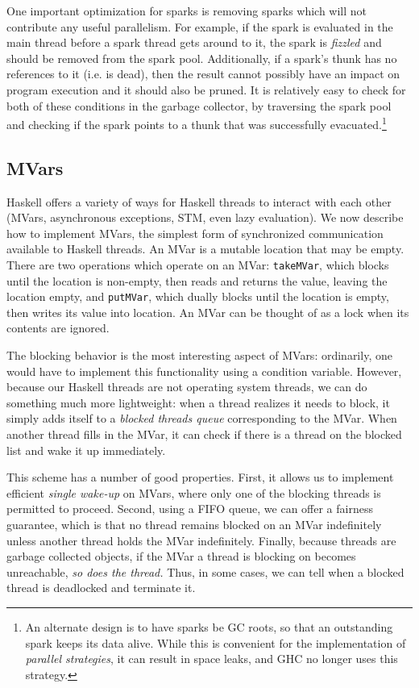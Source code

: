 One important optimization for sparks is removing sparks which will not
contribute any useful parallelism.  For example, if the spark is
evaluated in the main thread before a spark thread gets around to it,
the spark is \emph{fizzled} and should be removed from the spark pool.
Additionally, if a spark's thunk has no references to it (i.e. is dead),
then the result cannot possibly have an impact on program execution and
it should also be pruned.  It is relatively easy to check for both of
these conditions in the garbage collector, by traversing the spark pool
and checking if the spark points to a thunk that was successfully evacuated.\footnote{An alternate design is to have sparks be GC roots, so that an outstanding spark keeps its data alive. While this is convenient for the implementation of \emph{parallel strategies}, it can result in space leaks, and GHC no longer uses this strategy.}

\subsection{MVars}

Haskell offers a variety of ways for Haskell threads to interact with
each other (MVars, asynchronous exceptions, STM, even lazy evaluation).
We now describe how to implement MVars, the simplest form of
synchronized communication available to Haskell threads.  An MVar is a mutable
location that may be empty.  There are two operations which operate on
an MVar: \verb|takeMVar|, which blocks until the location is non-empty,
then reads and returns the value, leaving the location empty, and
\verb|putMVar|, which dually blocks until the location is empty, then
writes its value into location.  An MVar can be thought of as a lock when
its contents are ignored.

The blocking behavior is the most interesting aspect of MVars:
ordinarily, one would have to implement this functionality using a
condition variable.  However, because our Haskell threads are not
operating system threads, we can do something much more lightweight:
when a thread realizes it needs to block, it simply adds itself to a
\emph{blocked threads queue} corresponding to the MVar.  When another
thread fills in the MVar, it can check if there is a thread on the
blocked list and wake it up immediately.

This scheme has a number of good properties.  First, it allows us
to implement efficient \emph{single wake-up} on MVars, where only one of
the blocking threads is permitted to proceed. Second, using a FIFO
queue, we can offer a fairness guarantee, which is that no thread
remains blocked on an MVar indefinitely unless another thread holds the
MVar indefinitely.  Finally, because threads are garbage collected
objects, if the MVar a thread is blocking on becomes unreachable,
\emph{so does the thread.}  Thus, in some cases, we can tell when
a blocked thread is deadlocked and terminate it.

